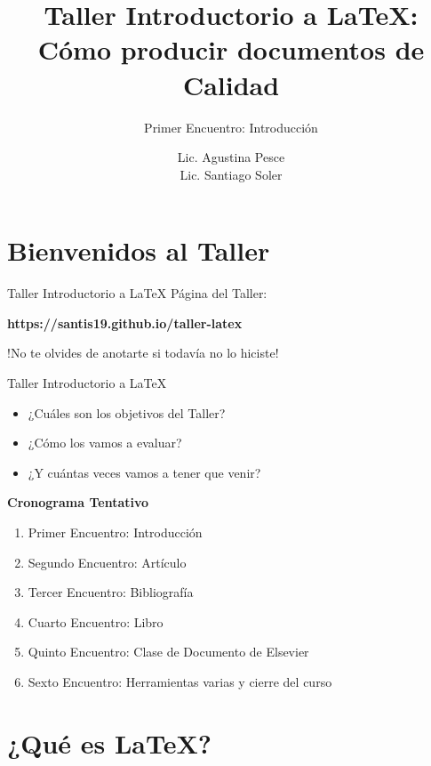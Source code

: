 \documentclass[11pt]{beamer}
\author{Lic. Agustina Pesce \\ Lic. Santiago Soler}
\title[Taller de {\LaTeX}]{Taller Introductorio a {\LaTeX}: \\ Cómo producir documentos de Calidad}
\subtitle{Primer Encuentro: Introducción}
\date{}
\begin{document}
\maketitle

\section{Bienvenidos al Taller}

\begin{frame}{Taller Introductorio a {\LaTeX}}
Página del Taller:
\begin{center}
\textbf{https://santis19.github.io/taller-latex}
\end{center}

\begin{block}{}
\begin{center}
!No te olvides de anotarte si todavía no lo hiciste!
\end{center}
\end{block}
\end{frame}

\begin{frame}{Taller Introductorio a {\LaTeX}}
\begin{itemize}[<+- | alert@+>] %
  \item ¿Cuáles son los objetivos del Taller?
  \item ¿Cómo los vamos a evaluar?
  \item ¿Y cuántas veces vamos a tener que venir?
\end{itemize}

\pause
\textbf{Cronograma Tentativo}


\begin{enumerate}
  \item Primer Encuentro: Introducción
  \item Segundo Encuentro: Artículo
  \item Tercer Encuentro: Bibliografía
  \item Cuarto Encuentro: Libro
  \item Quinto Encuentro: Clase de Documento de Elsevier
  \item Sexto Encuentro: Herramientas varias y cierre del curso
\end{enumerate}

\end{frame}


\section{¿Qué es {\LaTeX}?}
\end{document}
